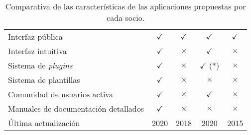 \begin{table}[h]
\begin{tabular}{@{}lcccc@{}}
		Interfaz pública & \cellcolor{green!25} {$\checkmark$} & \cellcolor{green!25} {$\checkmark$} & \cellcolor{green!25} {$\checkmark$} & \cellcolor{green!25} {$\checkmark$}\tabularnewline
		Interfaz intuitiva & \cellcolor{green!25} {$\checkmark$} & \cellcolor{red!25} {$\times$} & \cellcolor{green!25} {$\checkmark$} & \cellcolor{red!25} {$\times$}\tabularnewline
		Sistema de \emph{plugins} & \cellcolor{green!25} {$\checkmark$} & \cellcolor{red!25} {$\times$} & \cellcolor{green!25} {$\checkmark$} (*) & \cellcolor{red!25} {$\times$}\tabularnewline
		Sistema de plantillas & \cellcolor{green!25} {$\checkmark$} & \cellcolor{red!25} {$\times$} & \cellcolor{red!25} {$\times$} & \cellcolor{red!25} {$\times$}\tabularnewline
		Comunidad de usuarios activa & \cellcolor{green!25} {$\checkmark$} & \cellcolor{red!25} {$\times$} & \cellcolor{green!25} {$\checkmark$} & \cellcolor{red!25} {$\times$}\tabularnewline
		Manuales de documentación detallados & \cellcolor{green!25} {$\checkmark$} & \cellcolor{red!25} {$\times$} & \cellcolor{red!25} {$\times$} & \cellcolor{red!25} {$\times$}\tabularnewline
		Última actualización & 2020 & 2018 & 2020 & 2015\tabularnewline
		\bottomrule
	\end{tabular}
	\caption{Comparativa de las características de las aplicaciones propuestas por cada socio.}
\end{table}
